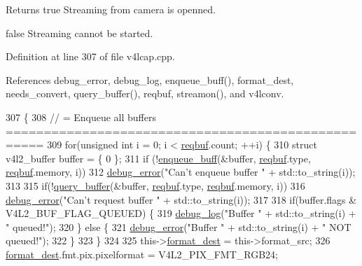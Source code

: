 \begin{DoxyReturn}{Returns}
true Streaming from camera is openned. 

false Streaming cannot be started. 
\end{DoxyReturn}


Definition at line 307 of file v4lcap.\+cpp.



References debug\+\_\+error, debug\+\_\+log, enqueue\+\_\+buff(), format\+\_\+dest, needs\+\_\+convert, query\+\_\+buffer(), reqbuf, streamon(), and v4lconv.


\begin{DoxyCode}
307                              \{
308     \textcolor{comment}{// = Enqueue all buffers ===================================================}
309     \textcolor{keywordflow}{for}(\textcolor{keywordtype}{unsigned} \textcolor{keywordtype}{int} i = 0; i < \hyperlink{classv4lcap_a4b98d5a7e7859a8e234d54649ea9251e}{reqbuf}.count; ++i) \{
310         \textcolor{keyword}{struct }v4l2\_buffer buffer = \{ 0 \};
311         \textcolor{keywordflow}{if} (!\hyperlink{classv4lcap_a61dcacb5bb57a9f8c72d6942f46e9ddc}{enqueue\_buff}(&buffer, \hyperlink{classv4lcap_a4b98d5a7e7859a8e234d54649ea9251e}{reqbuf}.type, \hyperlink{classv4lcap_a4b98d5a7e7859a8e234d54649ea9251e}{reqbuf}.memory, i))
312             \hyperlink{debug_8hpp_ab163a9e3f1ed9f61bd7d743fdf4a161a}{debug\_error}(\textcolor{stringliteral}{"Can't enqueue buffer "} + std::to\_string(i));
313 
315         \textcolor{keywordflow}{if}(!\hyperlink{classv4lcap_a238573a18b367ebc812a49f4f1917012}{query\_buffer}(&buffer, \hyperlink{classv4lcap_a4b98d5a7e7859a8e234d54649ea9251e}{reqbuf}.type, \hyperlink{classv4lcap_a4b98d5a7e7859a8e234d54649ea9251e}{reqbuf}.memory, i))
316             \hyperlink{debug_8hpp_ab163a9e3f1ed9f61bd7d743fdf4a161a}{debug\_error}(\textcolor{stringliteral}{"Can't request buffer "} + std::to\_string(i));
317 
318         \textcolor{keywordflow}{if}(buffer.flags & V4L2\_BUF\_FLAG\_QUEUED) \{
319             \hyperlink{debug_8hpp_afde3f42696113719c9ae35507125ee6e}{debug\_log}(\textcolor{stringliteral}{"Buffer "} + std::to\_string(i) + \textcolor{stringliteral}{" queued!"});
320         \} \textcolor{keywordflow}{else} \{
321             \hyperlink{debug_8hpp_ab163a9e3f1ed9f61bd7d743fdf4a161a}{debug\_error}(\textcolor{stringliteral}{"Buffer "} + std::to\_string(i) + \textcolor{stringliteral}{" NOT queued!"});
322         \}
323     \}
324 
325     this->\hyperlink{classv4lcap_a51d51cae7bdc2fe6aa5bec4ddbeb6c31}{format\_dest} = this->format\_src;
326     \hyperlink{classv4lcap_a51d51cae7bdc2fe6aa5bec4ddbeb6c31}{format\_dest}.fmt.pix.pixelformat = V4L2\_PIX\_FMT\_RGB24;

\end{DoxyCode}
